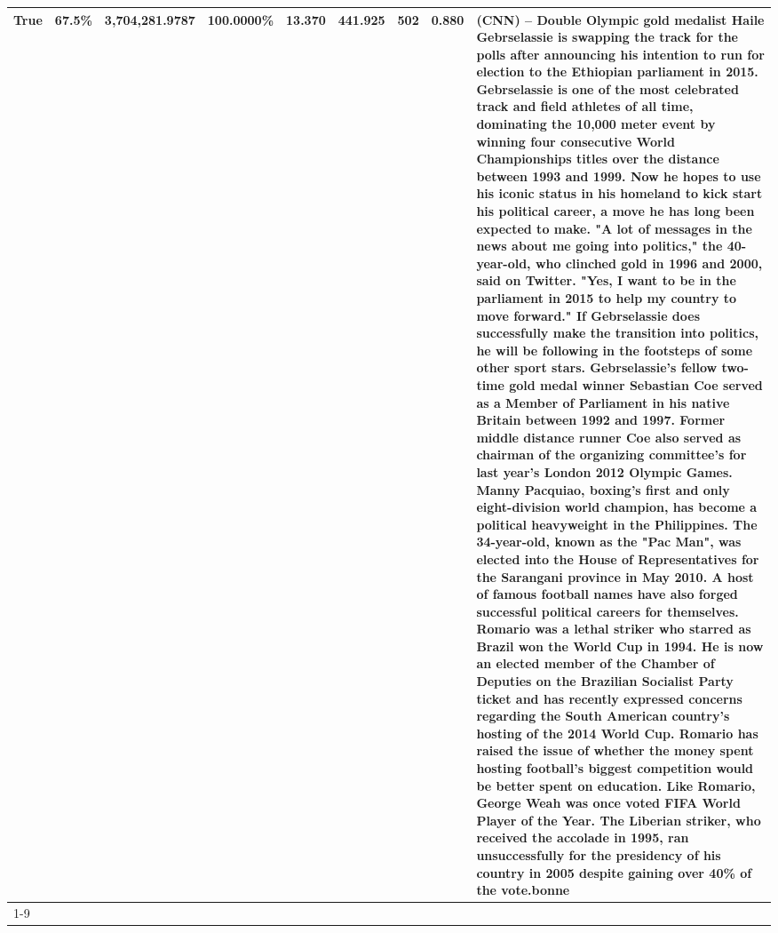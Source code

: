 \begin{table}[H]
{\begin{tabular}{lllrlllll}
True & 67.5\% & 3,704,281.9787 & \bfseries \color{red} 100.0000\% & 13.370 & 441.925 & 502 & 0.880 & (CNN) -- Double Olympic gold medalist Haile Gebrselassie is swapping the track for the polls after announcing his intention to run for election to the Ethiopian parliament in 2015. Gebrselassie is one of the most celebrated track and field athletes of all time, dominating the 10,000 meter event by winning four consecutive World Championships titles over the distance between 1993 and 1999. Now he hopes to use his iconic status in his homeland to kick start his political career, a move he has long been expected to make. "A lot of messages in the news about me going into politics," the 40-year-old, who clinched gold in 1996 and 2000, said on Twitter. "Yes, I want to be in the parliament in 2015 to help my country to move forward." If Gebrselassie does successfully make the transition into politics, he will be following in the footsteps of some other sport stars. Gebrselassie's fellow two-time gold medal winner Sebastian Coe served as a Member of Parliament in his native Britain between 1992 and 1997. Former middle distance runner Coe also served as chairman of the organizing committee's for last year's London 2012 Olympic Games. Manny Pacquiao, boxing's first and only eight-division world champion, has become a political heavyweight in the Philippines. The 34-year-old, known as the "Pac Man", was elected into the House of Representatives for the Sarangani province in May 2010. A host of famous football names have also forged successful political careers for themselves. Romario was a lethal striker who starred as Brazil won the World Cup in 1994. He is now an elected member of the Chamber of Deputies on the Brazilian Socialist Party ticket and has recently expressed concerns regarding the South American country's hosting of the 2014 World Cup. Romario has raised the issue of whether the money spent hosting football's biggest competition would be better spent on education. Like Romario, George Weah was once voted FIFA World Player of the Year. The Liberian striker, who received the accolade in 1995, ran unsuccessfully for the presidency of his country in 2005 despite gaining over 40\% of the vote.bonne \\
\cline{1-9}

\end{tabular}}
\end{table}
